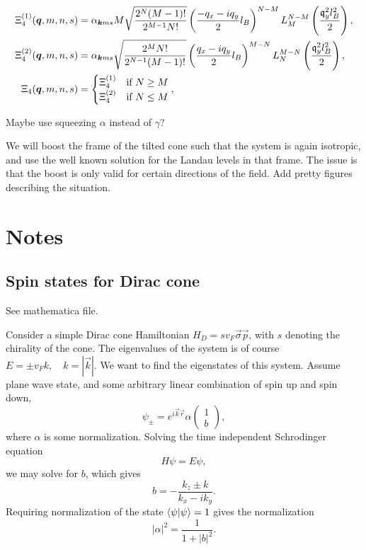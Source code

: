 \begin{align}
  \Xi_4 ^{(1)}(\bm{q}, m, n, s) &= \alpha _{\bm{k}ms} M \sqrt{\frac{2^N (M-1)!}{2^{M-1} N!}}
                                   \left( \frac{-q_x - iq_y}{2} l_B \right)^{N-M}
                                   L^{N-M}_{M} \left( \frac{\mathfrak{q}_y^2 l_B^2}{2} \right),\\
  \Xi_4 ^{(2)}(\bm{q}, m, n, s) &= \alpha _{\bm{k}ms} \sqrt{\frac{2^{M} N!}{2^{N-1} (M-1)!}}
                                   \left( \frac{q_x - iq_y}{2} l_B \right)^{M-N}
                                   L^{M - N}_N \left( \frac{\mathfrak{q}_y^2 l_B^2}{2} \right),\\
  \Xi_4(\bm{q}, m, n, s) &=
          \begin{cases}
            \Xi _4 ^{(1)} & \text{if } N \geq M\\
            \Xi _4 ^{(2)} & \text{if } N \leq M
          \end{cases}, \label{eq:42}
\end{align}



Maybe use squeezing \(\alpha \) instead of \(\gamma \)?





We will boost the frame of the tilted cone such that the system is again isotropic, and use the well known solution for the Landau levels in that frame.
The issue is that the boost is only valid for certain directions of the field.
Add pretty figures describing the situation.

\section{Notes}
\subsection{Spin states for Dirac cone}
See mathematica file.

Consider a simple Dirac cone Hamiltonian \(H_{D} = s v_{F} \vec{\sigma} \vec{p}\), with \(s\) denoting the chirality of the cone.
The eigenvalues of the system is of course \(E = \pm v_{F} k, \quad k=|\vec{k}|\).
We want to find the eigenstates of this system.
Assume plane wave state, and some arbitrary linear combination of spin up and spin down,
\[
  \psi _{\pm} = e^{i \vec{k} \vec{r}} \alpha
  \begin{pmatrix}
    1\\
    b
  \end{pmatrix},
\]
where \(\alpha \) is some normalization.
Solving the time independent Schrodinger equation
\[
H \psi = E \psi,
\]
we may solve for \(b\), which gives
\begin{equation}
  \label{eq:23}
  b = -\frac{k_{z} \pm k}{k_{x} - i k_{y}}.
\end{equation}
Requiring normalization of the state \(\braket{\psi | \psi } = 1\) gives the normalization
\[
|\alpha |^2 = \frac{1}{1 + |b|^2}.
\]

